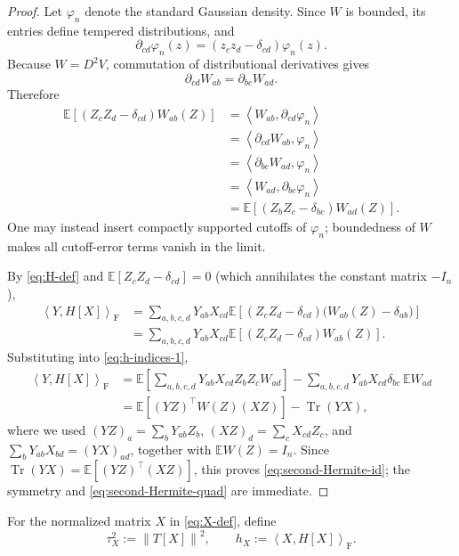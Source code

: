 \documentclass[11pt]{article}
\theoremstyle{plain}
\theoremstyle{definition}
\theoremstyle{remark}
\newcommand{\E}{\mathbb{E}}
\newcommand{\Tr}{\operatorname{Tr}}
\newcommand{\Id}{I}
\newcommand{\1}{\mathbf{1}}
\newcommand{\norm}[1]{\left\lVert #1\right\rVert}
\newcommand{\inner}[2]{\left\langle #1,#2\right\rangle}
\begin{document}
\begin{proof}
Let $\varphi_n$ denote the standard Gaussian density. Since $W$ is bounded,
its entries define tempered distributions, and
\[
    \partial_{cd}\varphi_n(z)
    =
    (z_cz_d-\delta_{cd})\varphi_n(z).
\]
Because $W=D^2V$, commutation of distributional derivatives gives
\[
    \partial_{cd}W_{ab}
    =
    \partial_{bc}W_{ad}.
\]
Therefore
\begin{align*}
    \E[(Z_cZ_d-\delta_{cd})W_{ab}(Z)]
    &=
    \left\langle W_{ab},\partial_{cd}\varphi_n\right\rangle\\
    &=
    \left\langle\partial_{cd}W_{ab},\varphi_n\right\rangle\\
    &=
    \left\langle\partial_{bc}W_{ad},\varphi_n\right\rangle\\
    &=
    \left\langle W_{ad},\partial_{bc}\varphi_n\right\rangle\\
    &=
    \E[(Z_bZ_c-\delta_{bc})W_{ad}(Z)].
\end{align*}
One may instead insert compactly supported cutoffs of $\varphi_n$; boundedness
of $W$ makes all cutoff-error terms vanish in the limit.

By \eqref{eq:H-def} and $\E[Z_cZ_d-\delta_{cd}]=0$ (which annihilates the
constant matrix $-\Id_n$),
\begin{align}
    \inner{Y}{H[X]}_{\mathrm F}
    &=
    \sum_{a,b,c,d}
    Y_{ab}X_{cd}
    \E\!\left[
        (Z_cZ_d-\delta_{cd})\bigl(W_{ab}(Z)-\delta_{ab}\bigr)
    \right]
    \nonumber\\
    &=
    \sum_{a,b,c,d}
    Y_{ab}X_{cd}
    \E\!\left[
        (Z_cZ_d-\delta_{cd})W_{ab}(Z)
    \right].
    \label{eq:h-indices-1}
\end{align}
Substituting into \eqref{eq:h-indices-1},
\begin{align*}
    \inner{Y}{H[X]}_{\mathrm F}
    &=
    \E\!\left[
        \sum_{a,b,c,d}
        Y_{ab}X_{cd}Z_bZ_cW_{ad}
    \right]
    -
    \sum_{a,b,c,d}
    Y_{ab}X_{cd}\delta_{bc}\,\E W_{ad}\\
    &=
    \E[(YZ)^\top W(Z)(XZ)]
    -
    \Tr(YX),
\end{align*}
where we used $(YZ)_a=\sum_bY_{ab}Z_b$, $(XZ)_d=\sum_cX_{cd}Z_c$, and
$\sum_bY_{ab}X_{bd}=(YX)_{ad}$, together with $\E W(Z)=\Id_n$. Since
$\Tr(YX)=\E[(YZ)^\top(XZ)]$, this proves
\eqref{eq:second-Hermite-id}; the symmetry and
\eqref{eq:second-Hermite-quad} are immediate.
\end{proof}

For the normalized matrix $X$ in \eqref{eq:X-def}, define
\begin{equation}
    \tau_X^2:=\norm{T[X]}^2,
    \qquad
    h_X:=\inner{X}{H[X]}_{\mathrm F}.
    \label{eq:tau-h-def}
\end{equation}
\end{document}
